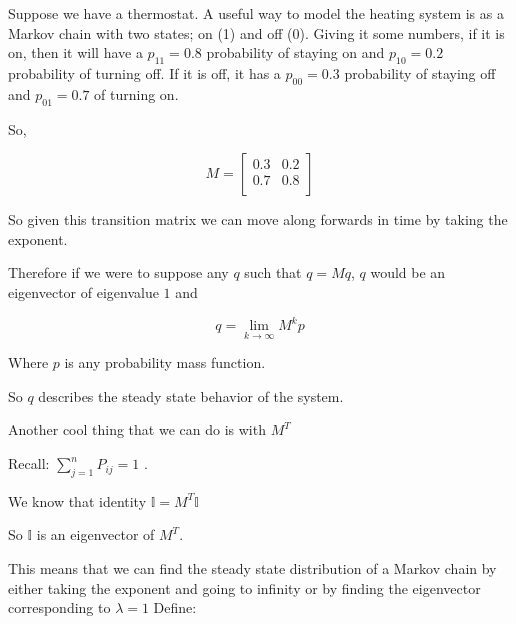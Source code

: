 \documentclass[10pt]{article}
\begin{document}
\begin{example}
	Suppose we have a thermostat.
	A useful way to model the heating system is as a Markov chain with two states; on (1) and off (0).
	Giving it some numbers, if it is on, then it will have a $ p_{11} = 0.8 $ probability of staying on and $ p_{10} = 0.2 $ probability of turning off.
	If it is off, it has a $ p_{00} = 0.3 $ probability of staying off and $ p_{01} = 0.7 $ of turning on.

	So,

	\begin{equation}
		M = 
		\begin{bmatrix} 
		0.3 & 0.2 \\
		0.7 & 0.8 \\
		\end{bmatrix} 
	\end{equation}

	So given this transition matrix we can move along forwards in time by taking the exponent.

	Therefore if we were to suppose any $ q $ such that $ q = Mq $, $ q $ would be an eigenvector of eigenvalue $  1 $ and

	\begin{equation}
		q = \lim_{k \to \infty} M^k p
	\end{equation}

	Where $ p $ is any probability mass function.

	So $ q $ describes the steady state behavior of the system.


	Another cool thing that we can do is with $ M^T $ 

	Recall: $ \sum_{j=1}^n P_{ij} = 1 $ .

	We know that identity $ \mathbb{I} = M^T \mathbb{I}  $ 

	So $ \mathbb{I} $ is an eigenvector of $ M^T $.

	This means that we can find the steady state distribution of a Markov chain by either taking the exponent and going to infinity or by finding the eigenvector corresponding to $ \lambda = 1$ 
	Define:


\end{example}
\end{document}
